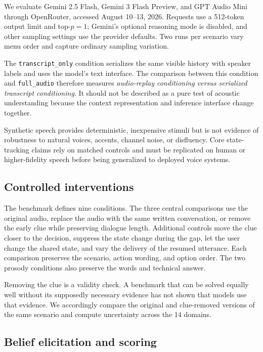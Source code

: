 \documentclass{article}
\begin{document}
We evaluate Gemini 2.5 Flash, Gemini 3 Flash Preview, and GPT Audio Mini through OpenRouter, accessed August 10--13, 2026. Requests use a 512-token output limit and top-$p=1$; Gemini's optional reasoning mode is disabled, and other sampling settings use the provider defaults. Two runs per scenario vary menu order and capture ordinary sampling variation.

The \texttt{transcript\_only} condition serializes the same visible history with speaker labels and uses the model's text interface. The comparison between this condition and \texttt{full\_audio} therefore measures \emph{audio-replay conditioning versus serialized transcript conditioning}. It should not be described as a pure test of acoustic understanding because the context representation and inference interface change together.

Synthetic speech provides deterministic, inexpensive stimuli but is not evidence of robustness to natural voices, accents, channel noise, or disfluency. Core state-tracking claims rely on matched controls and must be replicated on human or higher-fidelity speech before being generalized to deployed voice systems.

\subsection{Controlled interventions}

The benchmark defines nine conditions. The three central comparisons use the original audio, replace the audio with the same written conversation, or remove the early clue while preserving dialogue length. Additional controls move the clue closer to the decision, suppress the state change during the gap, let the user change the shared state, and vary the delivery of the resumed utterance. Each comparison preserves the scenario, action wording, and option order. The two prosody conditions also preserve the words and technical answer.

Removing the clue is a validity check. A benchmark that can be solved equally well without its supposedly necessary evidence has not shown that models use that evidence. We accordingly compare the original and clue-removed versions of the same scenario and compute uncertainty across the 14 domains.

\subsection{Belief elicitation and scoring}
\end{document}
